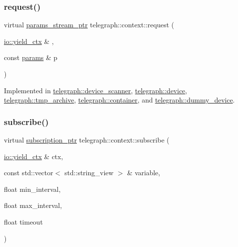 \subsubsection{\texorpdfstring{request()}{request()}}
{\footnotesize\ttfamily virtual \hyperlink{namespacetelegraph_ad071241508ea0f86c7de0686016f9ca9}{params\+\_\+stream\+\_\+ptr} telegraph\+::context\+::request (\begin{DoxyParamCaption}\item[{\hyperlink{structboost_1_1asio_1_1yield__ctx}{io\+::yield\+\_\+ctx} \&}]{,  }\item[{const \hyperlink{classtelegraph_1_1params}{params} \&}]{p }\end{DoxyParamCaption})\hspace{0.3cm}{\ttfamily [pure virtual]}}



Implemented in \hyperlink{classtelegraph_1_1device__scanner_a5873278cb04e50896c3f125639df4c73}{telegraph\+::device\+\_\+scanner}, \hyperlink{classtelegraph_1_1device_a9e5042e4640035b28dd9de780d7326df}{telegraph\+::device}, \hyperlink{classtelegraph_1_1tmp__archive_a688a661b85092244e5634f9c3e380f94}{telegraph\+::tmp\+\_\+archive}, \hyperlink{classtelegraph_1_1container_ade9ce299ee72554a84c1a71f0ad37915}{telegraph\+::container}, and \hyperlink{classtelegraph_1_1dummy__device_a46d728506b36e9e8b5b6939eb6aefe12}{telegraph\+::dummy\+\_\+device}.

\mbox{\label{classtelegraph_1_1context_a8db167973f187f707a4108e112683969}} 
\subsubsection{\texorpdfstring{subscribe()}{subscribe()}\hspace{0.1cm}{\footnotesize\ttfamily [1/2]}}
{\footnotesize\ttfamily virtual \hyperlink{namespacetelegraph_a58641aa5b1a2cbdb0431916a87069f64}{subscription\+\_\+ptr} telegraph\+::context\+::subscribe (\begin{DoxyParamCaption}\item[{\hyperlink{structboost_1_1asio_1_1yield__ctx}{io\+::yield\+\_\+ctx} \&}]{ctx,  }\item[{const std\+::vector$<$ std\+::string\+\_\+view $>$ \&}]{variable,  }\item[{float}]{min\+\_\+interval,  }\item[{float}]{max\+\_\+interval,  }\item[{float}]{timeout }\end{DoxyParamCaption})\hspace{0.3cm}{\ttfamily [pure virtual]}}



